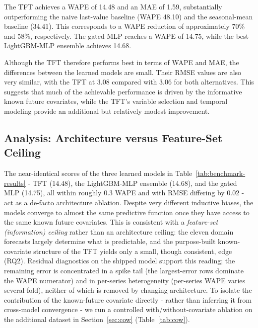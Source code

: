 \documentclass[11pt]{article}
\begin{document}
\noindent
The TFT achieves a WAPE of 14.48 and an MAE of 1.59, substantially outperforming the naive last-value baseline (WAPE 48.10) and the seasonal-mean baseline (34.41). This corresponds to a WAPE reduction of approximately 70\% and 58\%, respectively. The gated MLP reaches a WAPE of 14.75, while the best LightGBM-MLP ensemble achieves 14.68.
\newline

\noindent
Although the TFT therefore performs best in terms of WAPE and MAE, the differences between the learned models are small. Their RMSE values are also very similar, with the TFT at 3.08 compared with 3.06 for both alternatives. This suggests that much of the achievable performance is driven by the informative known future covariates, while the TFT's variable selection and temporal modeling provide an additional but relatively modest improvement.
\newline




\subsection{Analysis: Architecture versus Feature-Set Ceiling}

The near-identical scores of the three learned models in Table~\ref{tab:benchmark-results} - TFT (14.48), the
LightGBM-MLP ensemble (14.68), and the gated MLP (14.75), all within roughly $0.3$ WAPE and with
RMSE differing by $0.02$ - act as a de-facto architecture ablation. Despite very different inductive
biases, the models converge to almost the same predictive function once they have access to the same
known future covariates. This is consistent with a \emph{feature-set (information) ceiling} rather
than an architecture ceiling: the eleven domain forecasts largely determine what is predictable, and
the purpose-built known-covariate structure of the TFT yields only a small, though consistent, edge
(RQ2). Residual diagnostics on the shipped model support this reading; the remaining error is
concentrated in a spike tail (the largest-error rows dominate the WAPE numerator) and in per-series
heterogeneity (per-series WAPE varies several-fold), neither of which is removed by changing
architecture. To isolate the contribution of the known-future covariate directly - rather than
inferring it from cross-model convergence - we run a controlled with/without-covariate ablation on
the additional dataset in Section~\ref{sec:cow} (Table~\ref{tab:cow}).
\end{document}
